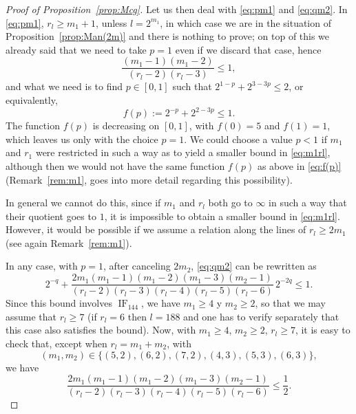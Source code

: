 \documentclass[11pt, a4paper]{article}
\newcommand{\IF}{\operatorname{IF}}
\theoremstyle{plain}
\theoremstyle{definition}
\begin{document}
\begin{proof}[Proof of Proposition~\ref{prop:Mcg}]
Let us then deal with \eqref{eq:pm1} and \eqref{eq:qm2}.
In \eqref{eq:pm1}, $r_l \ge m_1+1$, unless $l=2^{m_1}$, in which case we are in the situation of Proposition~\ref{prop:Man(2m)} and there is nothing to prove; on top of this we already said that we need to take $p=1$ even if we discard that case, hence
\begin{equation}
\label{eq:m1rl}
\frac{(m_1-1)(m_1-2)}{(r_l-2)(r_l-3)} \le 1,
\end{equation}
and what we need is to find $p \in [0,1]$ such that $2^{1-p} + 2^{3-3p} \le 2$, or equivalently,
\begin{equation}
\label{eq:f(p)}
f(p) := 2^{-p} + 2^{2-3p} \le 1.
\end{equation}
The function $f(p)$ is decreasing on $[0,1]$, with $f(0)=5$ and $f(1)=1$, which leaves us only with the choice $p=1$. We could choose a value $p < 1$ if $m_{1}$ and $r_{1}$ were restricted in such a way as to yield a smaller bound in \eqref{eq:m1rl}, although then we would not have the same function $f(p)$ as above in \eqref{eq:f(p)} (Remark~\ref{rem:m1}, goes into more detail regarding this possibility).

In general we cannot do this, since if $m_{1}$ and $r_{l}$ both go to $\infty$ in such a way that their quotient goes to $1$, it is impossible to obtain a smaller bound in \eqref{eq:m1rl}. However, it would be possible if we assume a relation along the lines of $r_l \ge 2m_1$ (see again Remark~\ref{rem:m1}).

In any case, with $p=1$, after canceling $2m_2$, \eqref{eq:qm2} can be rewritten as
\begin{equation}
\label{eq:qm2-sinp}
2^{-q} + \frac{2m_1(m_1-1)(m_1-2)(m_1-3)(m_2-1)}{(r_l-2)(r_l-3)(r_l-4)(r_l-5)(r_l-6)} \, 2^{-2q} \le 1.
\end{equation}
Since this bound involves $\IF_{144}$, we have $m_1\ge 4$ y $m_2\ge 2$, so that we may assume that $r_l \ge 7$ (if $r_l = 6$ then $l=188$ and one has to verify separately that this case also satisfies the bound).
Now, with $m_1\ge 4$, $m_2\ge 2$, $r_l \ge 7$, it is easy to check that, except when $r_l=m_1+m_2$, with
\begin{equation}
\label{eq:excepciones}
(m_1,m_2) \in \big\{ (5,2), (6,2), (7,2), (4,3), (5,3), (6,3) \big\},
\end{equation}
we have
\begin{equation}
\label{eq:1/2}
\frac{2m_1(m_1-1)(m_1-2)(m_1-3)(m_2-1)}{(r_l-2)(r_l-3)(r_l-4)(r_l-5)(r_l-6)} \le \frac{1}{2}.
\end{equation}


\end{proof}
\end{document}
